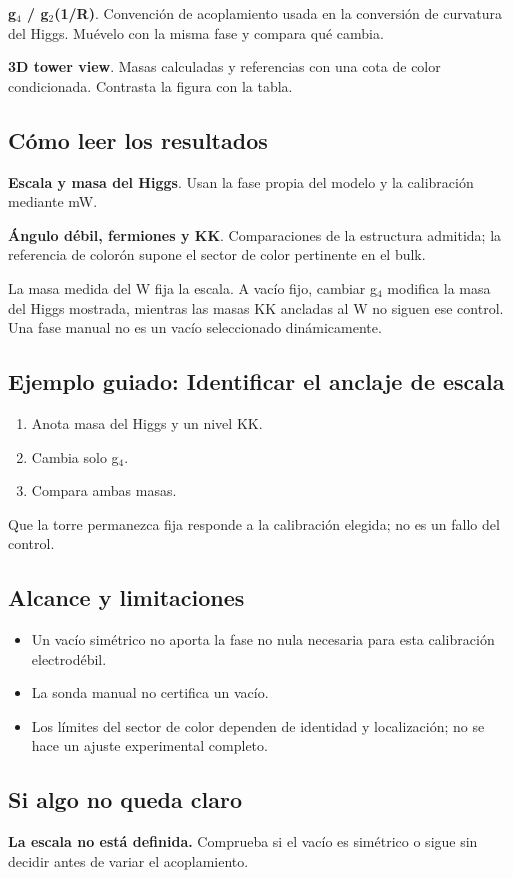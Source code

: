 \documentclass[11pt,a4paper]{article}
\begin{document}
\textbf{g\ensuremath{{}_{4}} / g\ensuremath{{}_{2}}(1/R)}. Convención de acoplamiento usada en la conversión de curvatura del Higgs. Muévelo con la misma fase y compara qué cambia.

\textbf{3D tower view}. Masas calculadas y referencias con una cota de color condicionada. Contrasta la figura con la tabla.

\subsection*{Cómo leer los resultados}
\textbf{Escala y masa del Higgs}. Usan la fase propia del modelo y la calibración mediante mW.

\textbf{Ángulo débil, fermiones y KK}. Comparaciones de la estructura admitida; la referencia de colorón supone el sector de color pertinente en el bulk.

La masa medida del W fija la escala. A vacío fijo, cambiar g\ensuremath{{}_{4}} modifica la masa del Higgs mostrada, mientras las masas KK ancladas al W no siguen ese control. Una fase manual no es un vacío seleccionado dinámicamente.
\subsection*{Ejemplo guiado: Identificar el anclaje de escala}
\begin{enumerate}
\item Anota masa del Higgs y un nivel KK.
\item Cambia solo g\ensuremath{{}_{4}}.
\item Compara ambas masas.
\end{enumerate}
Que la torre permanezca fija responde a la calibración elegida; no es un fallo del control.
\subsection*{Alcance y limitaciones}
\begin{itemize}
\item Un vacío simétrico no aporta la fase no nula necesaria para esta calibración electrodébil.
\item La sonda manual no certifica un vacío.
\item Los límites del sector de color dependen de identidad y localización; no se hace un ajuste experimental completo.
\end{itemize}
\subsection*{Si algo no queda claro}
\textbf{La escala no está definida.} Comprueba si el vacío es simétrico o sigue sin decidir antes de variar el acoplamiento.
\end{document}

